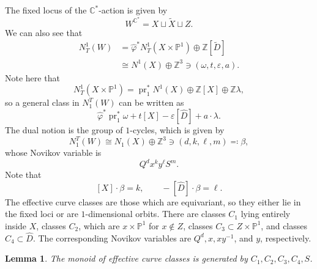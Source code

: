 \documentclass[leqno, openany]{memoir}
\newtheorem{lem}[thm]{Lemma}
\theoremstyle{definition}
\theoremstyle{remark}
\theoremstyle{plain}
\theoremstyle{definition}
\theoremstyle{remark}
\newcommand{\C}{\mathbb{C}}
\newcommand{\Z}{\mathbb{Z}}
\renewcommand{\P}{\mathbb{P}}
\newcommand{\ep}{\varepsilon}
\newcommand{\on}[1]{\operatorname{#1}}
\newcommand{\wt}[1]{\widetilde{#1}}
\newcommand{\wh}[1]{\widehat{#1}}
\begin{document}
The fixed locus of the $\C^*$-action is given by
\[ W^{\C^*} = X \sqcup \wt{X} \sqcup Z. \]
We can also see that
\begin{align*} 
    N_T^1(W) &= \wh{\varphi}^* N_T^1(X \times \P^1) \oplus \Z[\wt{D}]  \\
    &\cong N^1(X) \oplus \Z^3 \ni (\omega, t, \ep, a).
\end{align*}
Note here that
\[ N_T^1(X \times \P^1) = \on{pr}_1^* N^1(X) \oplus \Z[X] \oplus \Z \lambda, \]
so a general class in $N_1^T(W)$ can be written as
\[ \wh{\varphi}^* \on{pr}_1^* \omega + t [X] - \ep [\wh{D}] + a \cdot \lambda. \]
The dual notion is the group of $1$-cycles, which is given by
\[ N_1^T(W) \cong N_1(X) \oplus \Z^3 \ni (d, k, \ell, m) \eqqcolon \beta, \]
whose Novikov variable is
\[ Q^d x^k y^{\ell} S^m. \]
Note that
\[ [X] \cdot \beta = k, \qquad -[\wh{D}] \cdot \beta = \ell. \]
The effective curve classes are those which are equivariant, so they either lie in the fixed loci or are $1$-dimensional orbits. There are classes $C_1$ lying entirely inside $X$, classes $C_2$, which are $x \times \P^1$ for $x \notin Z$, classes $C_3 \subset Z \times \P^1$, and classes $C_4 \subset \wh{D}$. The corresponding Novikov variables are $Q^d, x, xy^{-1}$, and $y$, respectively.

\begin{lem}
    The monoid of effective curve classes is generated by $C_1, C_2, C_3, C_4, S$.
\end{lem}
\end{document}
